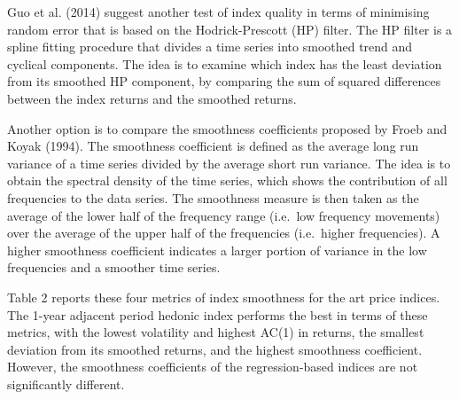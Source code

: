 \documentclass[]{elsarticle} %
\begin{document}
Guo et al. (2014) suggest another test of index quality in terms of
minimising random error that is based on the Hodrick-Prescott (HP)
filter. The HP filter is a spline fitting procedure that divides a time
series into smoothed trend and cyclical components. The idea is to
examine which index has the least deviation from its smoothed HP
component, by comparing the sum of squared differences between the index
returns and the smoothed returns.

Another option is to compare the smoothness coefficients proposed by
Froeb and Koyak (1994). The smoothness coefficient is defined as the
average long run variance of a time series divided by the average short
run variance. The idea is to obtain the spectral density of the time
series, which shows the contribution of all frequencies to the data
series. The smoothness measure is then taken as the average of the lower
half of the frequency range (i.e.~low frequency movements) over the
average of the upper half of the frequencies (i.e.~higher frequencies).
A higher smoothness coefficient indicates a larger portion of variance
in the low frequencies and a smoother time series.

Table 2 reports these four metrics of index smoothness for the art price
indices. The 1-year adjacent period hedonic index performs the best in
terms of these metrics, with the lowest volatility and highest AC(1) in
returns, the smallest deviation from its smoothed returns, and the
highest smoothness coefficient. However, the smoothness coefficients of
the regression-based indices are not significantly different.

\begin{table}[ht]
\centering
\caption{Smoothness Indicators} 
\end{table}
\end{document}
